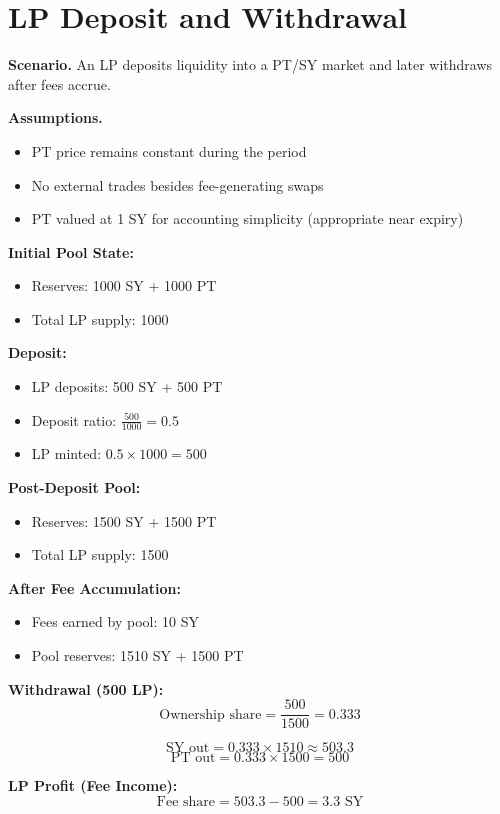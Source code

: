 \section{LP Deposit and Withdrawal}

\textbf{Scenario.}
An LP deposits liquidity into a PT/SY market and later withdraws after fees accrue.

\textbf{Assumptions.}
\begin{itemize}
\item PT price remains constant during the period
\item No external trades besides fee-generating swaps
\item PT valued at 1 SY for accounting simplicity (appropriate near expiry)
\end{itemize}

\textbf{Initial Pool State:}
\begin{itemize}
\item Reserves: 1000 SY + 1000 PT
\item Total LP supply: 1000
\end{itemize}

\textbf{Deposit:}
\begin{itemize}
\item LP deposits: 500 SY + 500 PT
\item Deposit ratio: $\frac{500}{1000} = 0.5$
\item LP minted: $0.5 \times 1000 = 500$
\end{itemize}

\textbf{Post-Deposit Pool:}
\begin{itemize}
\item Reserves: 1500 SY + 1500 PT
\item Total LP supply: 1500
\end{itemize}

\textbf{After Fee Accumulation:}
\begin{itemize}
\item Fees earned by pool: 10 SY
\item Pool reserves: 1510 SY + 1500 PT
\end{itemize}

\textbf{Withdrawal (500 LP):}
\[
\text{Ownership share} = \frac{500}{1500} = 0.333
\]

\[
\text{SY out} = 0.333 \times 1510 \approx 503.3
\]
\[
\text{PT out} = 0.333 \times 1500 = 500
\]

\textbf{LP Profit (Fee Income):}
\[
\text{Fee share} = 503.3 - 500 = 3.3 \text{ SY}
\]

